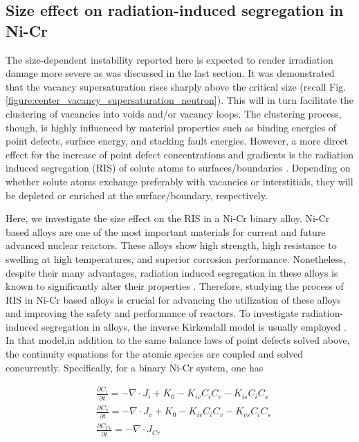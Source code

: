 \documentclass[utf8]{frontiersSCNS} %
\begin{document}
\clearpage
\subsection{Size effect on radiation-induced segregation in Ni-Cr }

The size-dependent instability reported here is expected to render irradiation damage more severe as was discussed in the last section. It was demonstrated that the vacancy supersaturation rises sharply above the critical size (recall Fig. \ref{figure:center_vacancy_supersaturation_neutron}). This will in turn facilitate the clustering of vacancies into voids and/or vacancy loops. The clustering process, though, is highly influenced by material properties such as binding energies of point defects, surface energy, and stacking fault energies. However, a more direct effect for the increase of point defect concentrations and gradients is the radiation induced segregation (RIS) of solute atoms to surfaces/boundaries \citep{was2017}. Depending on whether solute atoms exchange preferably with vacancies or interstitials, they will be depleted or enriched at the surface/boundary, respectively.

Here, we investigate the size effect on the RIS in a Ni-Cr binary alloy. Ni-Cr based alloys are one of the most important materials for current and future advanced nuclear reactors. These alloys show high strength, high resistance to swelling at high temperatures, and superior corrosion performance. Nonetheless, despite their many advantages, radiation induced segregation in these alloys is known to significantly alter their properties \citep{allen_effect_1997,was_emulation_2002,allen_thermal_2007,wharry_systematic_2013}. Therefore, studying the process of RIS in Ni-Cr based alloys is crucial for advancing the utilization of these alloys and improving the safety and performance of reactors.
To investigate radiation-induced segregation in alloys, the inverse Kirkendall model is usually employed \citep{allen_modeling_1998,wharry_mechanism_2014,was2017}. In that model,in addition to the same balance laws of point defects solved above, the continuity equations for the atomic species are coupled and solved concurrently. Specifically, for a binary Ni-Cr system, one has \citep{barr_grain_2015}

\begin{equation}
    \begin{aligned}
    &\frac{\partial C_i}{\partial t} = - \nabla\cdot J_i + K_0 - K_{iv}C_iC_v - K_{is}C_iC_s\\
    &\frac{\partial C_v}{\partial t} = - \nabla\cdot J_v + K_0 - K_{iv}C_iC_v - K_{vs}C_iC_s\\
    &\frac{\partial C_{Cr}}{\partial t} = - \nabla\cdot J_{Cr} \\
    \end{aligned}
    \label{equation:RIS_equations}
\end{equation}
\end{document}
